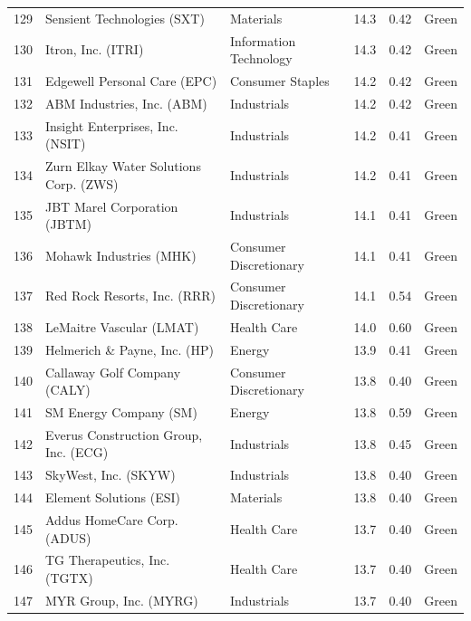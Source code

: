 \documentclass[11pt,a4paper]{article}
\begin{document}
{\begin{longtable}{r p{4.6cm} p{3cm} r r l}
129 & Sensient Technologies (SXT) & Materials & 14.3 & 0.42 & \cellcolor[HTML]{C6EFCE}Green \\
130 & Itron, Inc. (ITRI) & Information Technology & 14.3 & 0.42 & \cellcolor[HTML]{C6EFCE}Green \\
131 & Edgewell Personal Care (EPC) & Consumer Staples & 14.2 & 0.42 & \cellcolor[HTML]{C6EFCE}Green \\
132 & ABM Industries, Inc. (ABM) & Industrials & 14.2 & 0.42 & \cellcolor[HTML]{C6EFCE}Green \\
133 & Insight Enterprises, Inc. (NSIT) & Industrials & 14.2 & 0.41 & \cellcolor[HTML]{C6EFCE}Green \\
134 & Zurn Elkay Water Solutions Corp. (ZWS) & Industrials & 14.2 & 0.41 & \cellcolor[HTML]{C6EFCE}Green \\
135 & JBT Marel Corporation (JBTM) & Industrials & 14.1 & 0.41 & \cellcolor[HTML]{C6EFCE}Green \\
136 & Mohawk Industries (MHK) & Consumer Discretionary & 14.1 & 0.41 & \cellcolor[HTML]{C6EFCE}Green \\
137 & Red Rock Resorts, Inc. (RRR) & Consumer Discretionary & 14.1 & 0.54 & \cellcolor[HTML]{C6EFCE}Green \\
138 & LeMaitre Vascular (LMAT) & Health Care & 14.0 & 0.60 & \cellcolor[HTML]{C6EFCE}Green \\
139 & Helmerich \& Payne, Inc. (HP) & Energy & 13.9 & 0.41 & \cellcolor[HTML]{C6EFCE}Green \\
140 & Callaway Golf Company (CALY) & Consumer Discretionary & 13.8 & 0.40 & \cellcolor[HTML]{C6EFCE}Green \\
141 & SM Energy Company (SM) & Energy & 13.8 & 0.59 & \cellcolor[HTML]{C6EFCE}Green \\
142 & Everus Construction Group, Inc. (ECG) & Industrials & 13.8 & 0.45 & \cellcolor[HTML]{C6EFCE}Green \\
143 & SkyWest, Inc. (SKYW) & Industrials & 13.8 & 0.40 & \cellcolor[HTML]{C6EFCE}Green \\
144 & Element Solutions (ESI) & Materials & 13.8 & 0.40 & \cellcolor[HTML]{C6EFCE}Green \\
145 & Addus HomeCare Corp. (ADUS) & Health Care & 13.7 & 0.40 & \cellcolor[HTML]{C6EFCE}Green \\
146 & TG Therapeutics, Inc. (TGTX) & Health Care & 13.7 & 0.40 & \cellcolor[HTML]{C6EFCE}Green \\
147 & MYR Group, Inc. (MYRG) & Industrials & 13.7 & 0.40 & \cellcolor[HTML]{C6EFCE}Green \\

\end{longtable}}
\end{document}
